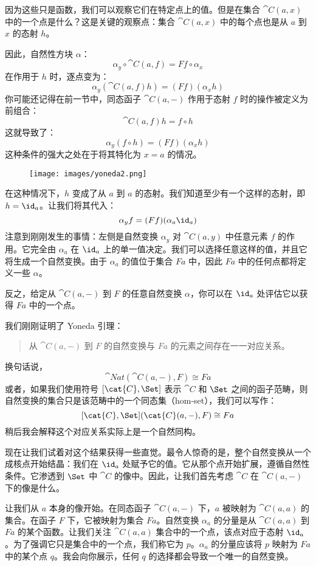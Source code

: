\noindent
因为这些只是函数，我们可以观察它们在特定点上的值。但是在集合 $\cat{C}(a, x)$ 中的一个点是什么？这是关键的观察点：集合 $\cat{C}(a, x)$ 中的每个点也是从 $a$ 到 $x$ 的态射 $h$。

因此，自然性方块 $\alpha$：
\[\alpha_y \circ \cat{C}(a, f) = F f \circ \alpha_x\]
在作用于 $h$ 时，逐点变为：
\[\alpha_y (\cat{C}(a, f) h) = (F f) (\alpha_x h)\]
你可能还记得在前一节中，同态函子 $\cat{C}(a,-)$ 作用于态射 $f$ 时的操作被定义为前组合：
\[\cat{C}(a, f) h = f \circ h\]
这就导致了：
\[\alpha_y (f \circ h) = (F f) (\alpha_x h)\]
这种条件的强大之处在于将其特化为 $x = a$ 的情况。

\begin{figure}[H]
  \centering
  \texttt{[image: images/yoneda2.png]}
\end{figure}

\noindent
在这种情况下，$h$ 变成了从 $a$ 到 $a$ 的态射。我们知道至少有一个这样的态射，即 $h = \id_a$。让我们将其代入：
\[\alpha_y f = (F f) (\alpha_a \id_a)\]
注意到刚刚发生的事情：左侧是自然变换 $\alpha_y$ 对 $\cat{C}(a, y)$ 中任意元素 $f$ 的作用。它完全由 $\alpha_a$ 在 $\id_a$ 上的单一值决定。我们可以选择任意这样的值，并且它将生成一个自然变换。由于 $\alpha_a$ 的值位于集合 $F a$ 中，因此 $F a$ 中的任何点都将定义一些 $\alpha$。

反之，给定从 $\cat{C}(a, -)$ 到 $F$ 的任意自然变换 $\alpha$，你可以在 $\id_a$ 处评估它以获得 $F a$ 中的一个点。

我们刚刚证明了 Yoneda 引理：

\begin{quote}
  从 $\cat{C}(a, -)$ 到 $F$ 的自然变换与 $F a$ 的元素之间存在一一对应关系。
\end{quote}
换句话说，
\[\cat{Nat}(\cat{C}(a, -), F) \cong F a\]
或者，如果我们使用符号 $[\cat{C}, \Set]$ 表示 $\cat{C}$ 和 $\Set$ 之间的函子范畴，则自然变换的集合只是该范畴中的一个同态集（hom-set），我们可以写作：
\[[\cat{C}, \Set](\cat{C}(a, -), F) \cong F a\]
稍后我会解释这个对应关系实际上是一个自然同构。

现在让我们试着对这个结果获得一些直觉。最令人惊奇的是，整个自然变换从一个成核点开始结晶：我们在 $\id_a$ 处赋予它的值。它从那个点开始扩展，遵循自然性条件。它渗透到 $\Set$ 中 $\cat{C}$ 的像中。因此，让我们首先考虑 $\cat{C}$ 在 $\cat{C}(a, -)$ 下的像是什么。

让我们从 $a$ 本身的像开始。在同态函子 $\cat{C}(a, -)$ 下，$a$ 被映射为 $\cat{C}(a, a)$ 的集合。在函子 $F$ 下，它被映射为集合 $F a$。自然变换 $\alpha_a$ 的分量是从 $\cat{C}(a, a)$ 到 $F a$ 的某个函数。让我们关注 $\cat{C}(a, a)$ 集合中的一个点，该点对应于态射 $\id_a$。为了强调它只是集合中的一个点，我们称它为 $p$。$\alpha_a$ 的分量应该将 $p$ 映射为 $F a$ 中的某个点 $q$。我会向你展示，任何 $q$ 的选择都会导致一个唯一的自然变换。

